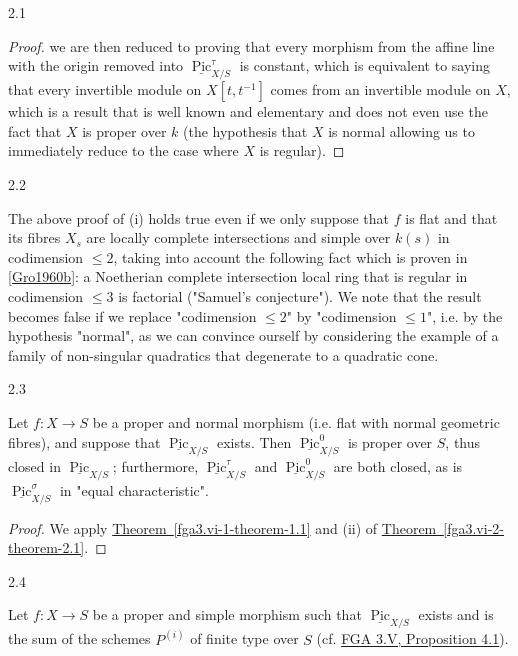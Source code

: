 \begin{theorem}{2.1}
\begin{proof}
      we are then reduced to proving that every morphism from the affine line with the origin removed into \(\underline {\operatorname {Pic}}_{X/S}^\tau \) is constant, which is equivalent to saying that every invertible module on \(X[t,t^{-1}]\) comes from an invertible module on \(X\), which is a result that is well known and elementary and does not even use the fact that \(X\) is proper over \(k\) (the hypothesis that \(X\) is normal allowing us to immediately reduce to the case where \(X\) is regular).\end{proof}\end{theorem}\begin{remark}{2.2}\label{fga3.vi-2-remark-2.2}\skipsinglepar\par{}The above proof of (i) holds true even if we only suppose that \(f\) is flat and that its fibres \(X_s\) are locally complete intersections and simple over \(k(s)\) in codimension \(\leqslant 2\), taking into account the following fact which is proven in \hyperref[Gro1960b]{[Gro1960b]}: a Noetherian complete intersection local ring that is regular in codimension \(\leqslant 3\) is factorial ("Samuel's conjecture").
    We note that the result becomes false if we replace "codimension \(\leqslant 2\)" by "codimension \(\leqslant 1\)", i.e. by the hypothesis "normal", as we can convince ourself by considering the example of a family of non-singular quadratics that degenerate to a quadratic cone.\end{remark}\begin{corollary}{2.3}\label{fga3.vi-2-corollary-2.3}\skipsinglepar\par{}Let \(f\colon  X\to  S\) be a proper and normal morphism (i.e. flat with normal geometric fibres), and suppose that \(\underline {\operatorname {Pic}}_{X/S}\) exists.
    Then \(\underline {\operatorname {Pic}}_{X/S}^0\) is proper over \(S\), thus closed in \(\underline {\operatorname {Pic}}_{X/S}\);
    furthermore, \(\underline {\operatorname {Pic}}_{X/S}^\tau \) and \(\underline {\operatorname {Pic}}_{X/S}^0\) are both closed, as is \(\underline {\operatorname {Pic}}_{X/S}^\sigma \) in "equal characteristic".\begin{proof}\par{}We apply \hyperref[fga3.vi-1-theorem-1.1]{Theorem~\ref*{fga3.vi-1-theorem-1.1}} and (ii) of \hyperref[fga3.vi-2-theorem-2.1]{Theorem~\ref*{fga3.vi-2-theorem-2.1}}.\end{proof}\end{corollary}\begin{corollary}{2.4}\label{fga3.vi-2-corollary-2.4}\skipsinglepar\par{}Let \(f\colon  X\to  S\) be a proper and simple morphism such that \(\underline {\operatorname {Pic}}_{X/S}\) exists and is the sum of the schemes \(P^{(i)}\) of finite type over \(S\) (cf. \hyperref[fga3.v-4-proposition-4.1]{FGA 3.V, Proposition 4.1}).

\end{corollary}
